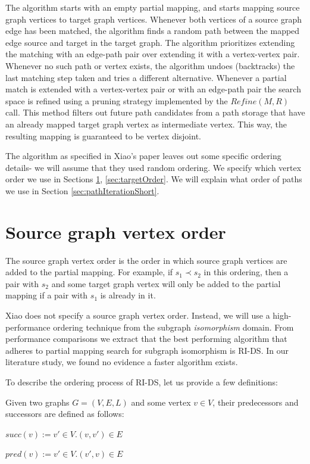 The algorithm starts with an empty partial mapping, and starts mapping source graph vertices to target graph vertices. Whenever both vertices of a source graph edge has been matched, the algorithm finds a random path between the mapped edge source and target in the target graph. The algorithm prioritizes extending the matching with an edge-path pair over extending it with a vertex-vertex pair. Whenever no such path or vertex exists, the algorithm undoes (backtracks) the last matching step taken and tries a different alternative. Whenever a partial match is extended with a vertex-vertex pair or with an edge-path pair the search space is refined using a pruning strategy implemented by the $Refine(M,R)$ call. This method filters out future path candidates from a path storage that have an already mapped target graph vertex as intermediate vertex. This way, the resulting mapping is guaranteed to be vertex disjoint.

The algorithm as specified in Xiao's paper leaves out some specific ordering details- we will assume that they used random ordering. We specify which vertex order we use in Sections \ref{sec:sourceOrder}, \ref{sec:targetOrder}. We will explain what order of paths we use in Section \ref{sec:pathIterationShort}.

\section{Source graph vertex order}
\label{sec:sourceOrder}
The source graph vertex order is the order in which source graph vertices are added to the partial mapping. For example, if $s_1 \prec s_2$ in this ordering, then a pair with $s_2$ and some target graph vertex will only be added to the partial mapping if a pair with $s_1$ is already in it.

Xiao does not specify a source graph vertex order. Instead, we will use a high-performance ordering technique from the subgraph \textit{isomorphism} domain. From performance comparisons we extract that the best performing algorithm that adheres to partial mapping search for subgraph isomorphism is RI-DS. In our literature study, we found no evidence a faster algorithm exists. 

To describe the ordering process of RI-DS, let us provide a few definitions:

\begin{defn}
Given two graphs $G=(V, E, L)$ and some vertex $v \in V$, their predecessors and successors are defined as follows:

$succ(v) := {v' \in V . (v, v') \in E}$

$pred(v) := {v' \in V . (v', v) \in E}$
 
\end{defn}

